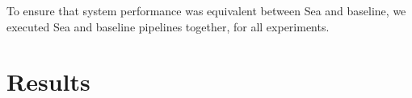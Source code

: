     To ensure that system performance was equivalent between Sea and baseline,
    we executed Sea and baseline pipelines together, for all experiments.
    
    \section{Results}



